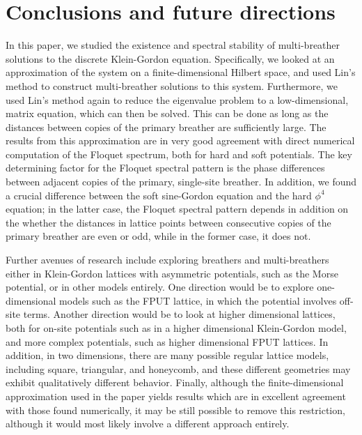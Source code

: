 \documentclass[12pt,reqno]{amsart}
\theoremstyle{definition}
\begin{document}
\section{Conclusions and future directions}\label{sec:conc}

In this paper, we studied the existence and spectral stability of multi-breather solutions to the discrete Klein-Gordon equation. Specifically, we looked at an approximation of the system on a finite-dimensional Hilbert space, and used Lin's method to construct multi-breather solutions to this system. Furthermore, we used Lin's method again to reduce the eigenvalue problem to a low-dimensional, matrix equation, which can then be solved. This can be done as long as the distances between copies of the primary breather are sufficiently large. The results from this approximation are in very good agreement with direct numerical computation of the Floquet spectrum, both for hard and soft potentials. The key determining factor for the Floquet spectral pattern is the phase differences between adjacent copies of the primary, single-site breather. In addition, we found a crucial difference between the soft sine-Gordon equation and the hard $\phi^4$ equation; in the latter case, the Floquet spectral pattern depends in addition on the whether the distances in lattice points between consecutive copies of the primary breather are even or odd, while in the former case, it does not. 

Further avenues of research include exploring breathers and multi-breathers either in Klein-Gordon lattices with asymmetric potentials, such as the Morse potential, or in other models entirely. One direction would be to explore one-dimensional models such as the FPUT lattice, in which the potential involves off-site terms. Another direction would be to look at higher dimensional lattices, both for on-site potentials such as in a higher dimensional Klein-Gordon model, and more complex potentials, such as higher dimensional FPUT lattices. In addition, in two dimensions, there are many possible regular lattice models, including square, triangular, and honeycomb, and these different geometries may exhibit qualitatively different behavior. Finally, although the finite-dimensional approximation used in the paper yields results which are in excellent agreement with those found numerically, it may be still possible to remove this restriction, although it would most likely involve a different approach entirely.

\vspace{0.5cm}
\end{document}
